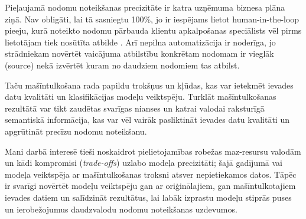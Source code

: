 Pieļaujamā nodomu noteikšanas precizitāte ir katra uzņēmuma biznesa plāna ziņā. Nav obligāti, lai tā sasniegtu 100\%, jo ir iespējams lietot human-in-the-loop pieeju, kurā noteikto nodomu pārbauda klientu apkalpošanas speciālists vēl pirms lietotājam tiek nosūtīta atbilde \cite{paikens2020}. Arī nepilna automatizācija ir noderīga, jo strādniekam novērtēt vaicājuma atbilstību konkrētam nodomam ir vieglāk (source) nekā izvērtēt kuram no daudziem nodomiem tas atbilst.

Taču mašīntulkošana rada papildu trokšņus un kļūdas, kas var ietekmēt ievades datu kvalitāti un klasifikācijas modeļu veiktspēju. Turklāt mašīntulkošanas rezultātā var tikt zaudētas svarīgas nianses un katrai valodai raksturīgā semantiskā informācija, kas var vēl vairāk pasliktināt ievades datu kvalitāti un apgrūtināt precīzu nodomu noteikšanu.

Mani darbā interesē tieši noskaidrot pielietojamības robežas maz-resursu valodām un kādi kompromisi (\textit{trade-offs}) uzlabo modeļa precizitāti; šajā gadījumā vai modeļa veiktspēja ar mašīntulkošanas troksni atsver nepietiekamos datos. Tāpēc ir svarīgi novērtēt modeļu veiktspēju gan ar oriģinālajiem, gan mašīntulkotajiem ievades datiem un salīdzināt rezultātus, lai labāk izprastu modeļu stiprās puses un ierobežojumus daudzvalodu nodomu noteikšanas uzdevumos.
